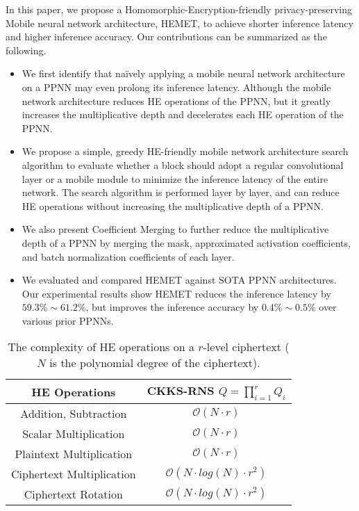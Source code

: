 \documentclass{article}
\begin{document}
	

	
	
	
In this paper, we propose a Homomorphic-Encryption-friendly privacy-preserving Mobile neural network architecture, HEMET, to achieve shorter inference latency and higher inference accuracy. Our contributions can be summarized as the following.
\begin{itemize}[noitemsep,topsep=0pt,parsep=0pt,partopsep=0pt,leftmargin=*]


\item We first identify that na\"ively applying a mobile neural network architecture on a PPNN may even prolong its inference latency. Although the mobile network architecture reduces HE operations of the PPNN, but it greatly increases the multiplicative depth and decelerates each HE operation of the PPNN.


\item We propose a simple, greedy HE-friendly mobile network architecture search algorithm to evaluate whether a block should adopt a regular convolutional layer or a mobile module to minimize the inference latency of the entire network. The search algorithm is performed layer by layer, and can reduce HE operations without increasing the multiplicative depth of a PPNN. 


\item We also present Coefficient Merging to further reduce the multiplicative depth of a PPNN by merging the mask, approximated activation coefficients, and batch normalization coefficients of each layer.
		
\item We evaluated and compared HEMET against SOTA PPNN architectures. Our experimental results show HEMET reduces the inference latency by $59.3\%\sim 61.2\%$, but improves the inference accuracy by $0.4\% \sim 0.5\%$ over various prior PPNNs.


\end{itemize}
	
	
\begin{table}[t!]
\small
\centering
\setlength{\tabcolsep}{4pt}
		\begin{tabular}{|c||c|} \hline
			HE Operations               & CKKS-RNS  $Q=\prod_{i=1}^{r}{Q_i}$ \\\hline\hline
			Addition, Subtraction       & $\mathcal{O}(N\cdot r)$         \\\hline
			Scalar Multiplication		& $\mathcal{O}(N\cdot r)$         \\\hline
			Plaintext Multiplication    & $\mathcal{O}(N\cdot r)$         \\\hline
			Ciphertext Multiplication	& $\mathcal{O}(N\cdot log(N)\cdot r^2)$         \\\hline
			Ciphertext Rotation	        & $\mathcal{O}(N\cdot log(N)\cdot r^2)$         \\\hline	
		\end{tabular}
		\caption{The complexity of HE operations on a $r$-level ciphertext ($N$ is the polynomial degree of the ciphertext).}
		\label{t:moti2_merge}
\vspace{-0.2in}
\end{table}
	
\end{document}
